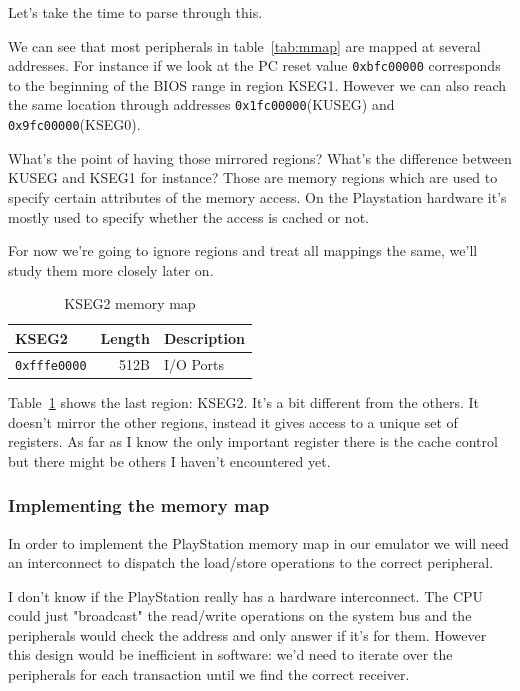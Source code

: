 \documentclass[a4paper]{article}
\newcommand{\code}[1] {\texttt{#1}}
\begin{document}
Let's take the time to parse through this.

We can see that most peripherals in table~\ref{tab:mmap} are mapped at
several addresses. For instance if we look at the PC reset
value \code{0xbfc00000} corresponds to the beginning of the BIOS range in
region KSEG1. However we can also reach the same location through
addresses \code{0x1fc00000}(KUSEG) and \code{0x9fc00000}(KSEG0).

What's the point of having those mirrored regions? What's the
difference between KUSEG and KSEG1 for instance? Those are memory
regions which are used to specify certain attributes of the memory
access. On the Playstation hardware it's mostly used to specify
whether the access is cached or not.

For now we're going to ignore regions and treat all mappings the same,
we'll study them more closely later on.

\begin{table}[ht]
  \centering

  \begin{tabular}{ l | r | l }
    KSEG2 & Length & Description \\
    \hline
    \code{0xfffe0000} & 512B & I/O Ports \\
  \end{tabular}

  \caption{KSEG2 memory map}
  \label{tab:kseg2}
\end{table}

Table~\ref{tab:kseg2} shows the last region: KSEG2. It's a bit
different from the others. It doesn't mirror the other regions,
instead it gives access to a unique set of registers. As far as I know
the only important register there is the cache control but there might
be others I haven't encountered yet.

\subsubsection{Implementing the memory map}

In order to implement the PlayStation memory map in our emulator we
will need an interconnect to dispatch the load/store operations to the
correct peripheral.

I don't know if the PlayStation really has a hardware
interconnect. The CPU could just "broadcast" the read/write operations
on the system bus and the peripherals would check the address and only
answer if it's for them. However this design would be inefficient in
software: we'd need to iterate over the peripherals for each
transaction until we find the correct receiver.
\end{document}
